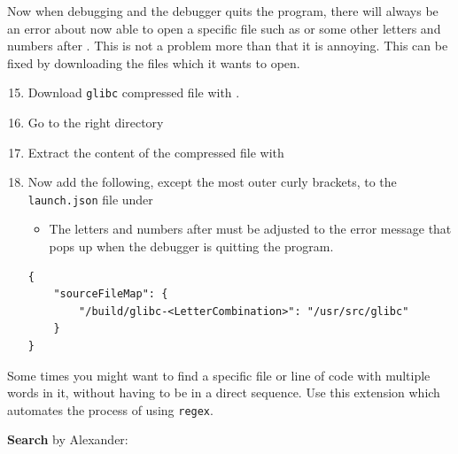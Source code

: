 Now when debugging and the debugger quits the program, there will always be an error about now able to open a specific file such as  or some other letters and numbers after . This is not a problem more than that it is annoying. This can be fixed by downloading the files which it wants to open.

\begin{enumerate}
    \setcounter{enumi}{14}
    
    \item Download \texttt{glibc} compressed file with .
    
    \item Go to the right directory 
    
    \item Extract the content of the compressed file with 
    
    \item Now add the following, except the most outer curly brackets, to the \texttt{launch.json} file under\\
    \begin{itemize}
        \item The letters and numbers  after  must be adjusted to the error message that pops up when the debugger is quitting the program.
    \end{itemize}
    
    \begin{verbatim}
{
    "sourceFileMap": {
        "/build/glibc-<LetterCombination>": "/usr/src/glibc"
    }
}
    \end{verbatim}
\end{enumerate}


Some times you might want to find a specific file or line of code with multiple words in it, without
having to be in a direct sequence. Use this extension which automates the process of using \texttt{regex}.

\textbf{Search} by Alexander:

